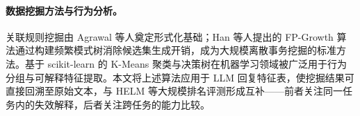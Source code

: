 \paragraph{数据挖掘方法与行为分析。}
关联规则挖掘由 Agrawal 等人奠定形式化基础\cite{agrawal1993mining}；Han 等人提出的 FP-Growth 算法通过构建频繁模式树消除候选集生成开销，成为大规模离散事务挖掘的标准方法\cite{han2000mining}。基于 scikit-learn\cite{pedregosa2011scikit} 的 K-Means 聚类与决策树在机器学习领域被广泛用于行为分组与可解释特征提取。本文将上述算法应用于 LLM 回复特征表，使挖掘结果可直接回溯至原始文本，与 HELM 等大规模排名评测\cite{liang2022holistic}形成互补——前者关注同一任务内的失效解释，后者关注跨任务的能力比较。
